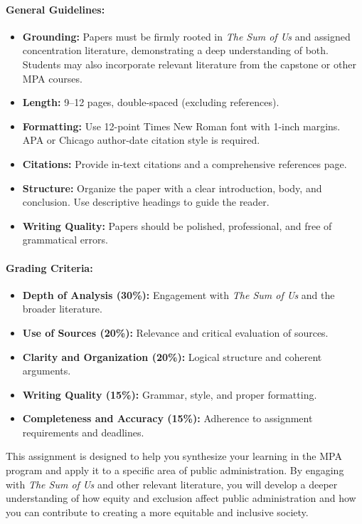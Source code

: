 \documentclass[12pt, letterpaper]{article}
\begin{document}
\paragraph*{General Guidelines:}
\begin{itemize}
    \item \textbf{Grounding:} Papers must be firmly rooted in \textit{The Sum of Us} and assigned concentration literature, demonstrating a deep understanding of both. Students may also incorporate relevant literature from the capstone or other MPA courses.  
    \item \textbf{Length:} 9--12 pages, double-spaced (excluding references).  
    \item \textbf{Formatting:} Use 12-point Times New Roman font with 1-inch margins. APA or Chicago author-date citation style is required.  
    \item \textbf{Citations:} Provide in-text citations and a comprehensive references page.  
    \item \textbf{Structure:} Organize the paper with a clear introduction, body, and conclusion. Use descriptive headings to guide the reader.  
    \item \textbf{Writing Quality:} Papers should be polished, professional, and free of grammatical errors.  
\end{itemize}

\paragraph*{Grading Criteria:}
\begin{itemize}
    \item \textbf{Depth of Analysis (30\%):} Engagement with \textit{The Sum of Us} and the broader literature.
    \item \textbf{Use of Sources (20\%):} Relevance and critical evaluation of sources.
    \item \textbf{Clarity and Organization (20\%):} Logical structure and coherent arguments.
    \item \textbf{Writing Quality (15\%):} Grammar, style, and proper formatting.
    \item \textbf{Completeness and Accuracy (15\%):} Adherence to assignment requirements and deadlines.
\end{itemize}
\noindent This assignment is designed to help you synthesize your learning in the MPA program and apply it to a specific area of public administration. By engaging with \textit{The Sum of Us} and other relevant literature, you will develop a deeper understanding of how equity and exclusion affect public administration and how you can contribute to creating a more equitable and inclusive society.
\end{document}
